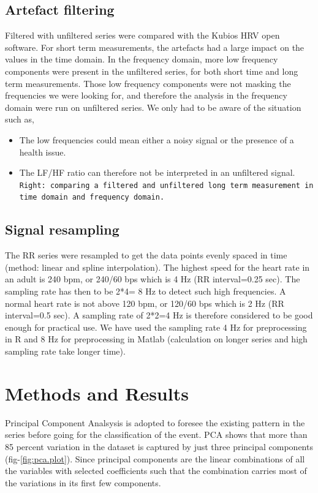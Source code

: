 \documentclass[a4paper, 11pt]{report}\usepackage[]{graphicx}\usepackage[]{color}
\numberwithin{figure}{section}
\begin{document}
\section{Artefact filtering}
Filtered with unfiltered series were compared with the Kubios HRV open software. For short term measurements, the artefacts had a large impact on the values in the time domain. In the frequency domain, more low frequency components were present in the unfiltered series, for both short time and long term measurements. Those low frequency components were not masking the frequencies we were looking for, and therefore the analysis in the frequency domain were run on unfiltered series. We only had to be aware of the situation such as,
\begin{itemize}
\item The low frequencies could mean either a noisy signal or the presence of a health issue.
\item The LF/HF ratio can therefore not be interpreted in an unfiltered signal. 
{\color{red}\texttt{Right: comparing a filtered and unfiltered long term measurement in time domain and frequency domain.}}
\end{itemize}

\section{Signal resampling}
The RR series were resampled to get the data points evenly spaced in time (method: linear and spline interpolation). The highest speed for the heart rate in an adult is 240 bpm, or 240/60 bps which is 4 Hz (RR interval=0.25 sec). The sampling rate has then to be 2*4= 8 Hz to detect such high frequencies. A normal heart rate is not above 120 bpm, or 120/60 bps which is 2 Hz (RR interval=0.5 sec). A sampling rate of 2*2=4 Hz is therefore considered to be good enough for practical use. We have used the sampling rate 4 Hz for preprocessing in R and 8 Hz for preprocessing in Matlab (calculation on longer series and high sampling rate take longer time).

\chapter{Methods and Results}
Principal Component Analsysis is adopted to foresee the existing pattern in the series before going for the classification of the event. PCA shows that more than 85 percent variation in the dataset is captured by just three principal components (fig-\ref{fig:pca.plot}). Since principal components are the linear combinations of all the variables with selected coefficients such that the combination carries most of the variations in its first few components.
\end{document}
